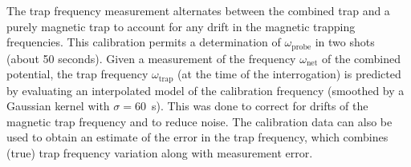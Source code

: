 	The trap frequency measurement alternates between the combined trap and a purely magnetic trap to account for any drift in the magnetic trapping frequencies. 
	This calibration permits a determination of $\omega_\mathrm{probe}$ in two shots (about 50 seconds). 
	Given a measurement of the frequency $\omega_\mathrm{net}$ of the combined potential, the trap frequency $\omega_\mathrm{trap}$ (at the time of the interrogation) is predicted  by evaluating an interpolated model of the calibration frequency (smoothed by a Gaussian kernel with $\sigma=60$~s).
	This was done to correct for drifts of the magnetic trap frequency and to reduce noise. 
	The calibration data can also be used to obtain an estimate of the error in the trap frequency, which combines (true) trap frequency variation along with measurement error. 
	

		


	
